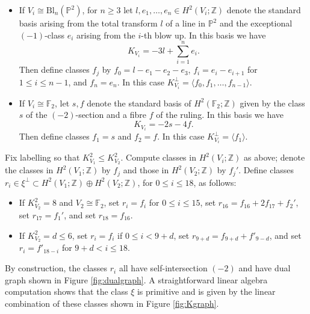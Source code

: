 \documentclass[a4paper]{amsart}
\theoremstyle{definition}
\theoremstyle{plain}
\theoremstyle{remark}
\newcommand{\bF}{\mathbb{F}}
\newcommand{\bP}{\mathbb{P}}
\newcommand{\bZ}{\mathbb{Z}}
\numberwithin{figure}{section}
\numberwithin{table}{section}
\begin{document}
\begin{itemize}
\item If $V_i \cong \mathrm{Bl}_n(\bP^2)$, for $n \geq 3$  let $l,e_1,\ldots,e_{n} \in H^2(V_i;\bZ)$ denote the standard basis arising from the total transform $l$ of a line in $\bP^2$ and the exceptional $(-1)$-class $e_i$ arising from the $i$-th blow up. In this basis we have 
\[K_{V_i} = -3l + \sum_{i=1}^{n} e_i.\] 
Then define classes $f_j$ by $f_0 = l-e_1-e_2-e_3$, $f_i = e_i - e_{i+1}$ for $1 \leq i \leq n-1$, and $f_{n} = e_{n}$. In this case $K_{V_i}^{\perp} = \langle f_0,f_1,\ldots,f_{n-1} \rangle$.
\item If $V_i \cong \bF_2$, let $s,f$ denote the standard basis of $H^2(\bF_2;\bZ)$ given by the class $s$ of the $(-2)$-section and a fibre $f$ of the ruling. In this basis we have 
\[K_{V_i} = -2s-4f.\] 
Then define classes $f_1 = s$ and $f_2 = f$. In this case $K_{V_i}^{\perp} = \langle f_1 \rangle$.
\end{itemize}

Fix labelling so that $K_{V_1}^2 \leq K_{V_2}^2$. Compute classes in $H^2(V_i;\bZ)$ as above; denote the classes in  $H^2(V_1;\bZ)$ by $f_j$ and those in $H^2(V_2;\bZ)$ by $f_j'$. Define classes $r_i \in \xi^{\perp} \subset H^2(V_1;\bZ) \oplus H^2(V_2;\bZ)$, for $0 \leq i \leq 18$, as follows:
\begin{itemize}
\item If $K_{V_2}^2 = 8$ and $V_2 \cong \bF_2$, set $r_i = f_i$ for $0 \leq i \leq 15$, set $r_{16} =  f_{16} + 2f_{17} + f_2'$, set $r_{17} = f_1'$, and set $r_{18} = f_{16}$.
\item If $K_{V_2}^2 = d \leq 6$, set $r_i = f_i$ if $0 \leq i < 9+d$, set $r_{9+d} = f_{9+d}+f'_{9-d}$, and set $r_i = f'_{18-i}$ for $9+d < i \leq 18$.
\end{itemize}

By construction, the classes $r_i$ all have self-intersection $(-2)$ and have dual graph shown in Figure \ref{fig:dualgraph}. A straightforward linear algebra computation shows that the class $\xi$ is primitive and is given by the linear combination of these classes shown in Figure \ref{fig:Kgraph}. 
\end{document}
